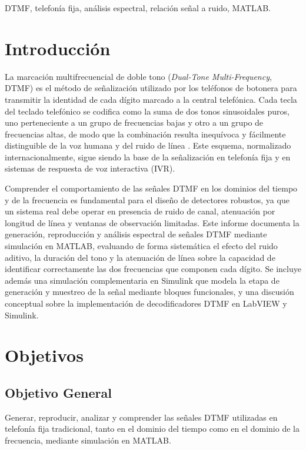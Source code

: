 \documentclass[conference]{IEEEtran}
\begin{document}
\begin{IEEEkeywords}
DTMF, telefonía fija, análisis espectral, relación señal a ruido, MATLAB.
\end{IEEEkeywords}

\section{Introducción}

La marcación multifrecuencial de doble tono (\textit{Dual-Tone Multi-Frequency}, DTMF) es el método de señalización utilizado por los teléfonos de botonera para transmitir la identidad de cada dígito marcado a la central telefónica. Cada tecla del teclado telefónico se codifica como la suma de dos tonos sinusoidales puros, uno perteneciente a un grupo de frecuencias bajas y otro a un grupo de frecuencias altas, de modo que la combinación resulta inequívoca y fácilmente distinguible de la voz humana y del ruido de línea \cite{itu-q23}. Este esquema, normalizado internacionalmente, sigue siendo la base de la señalización en telefonía fija y en sistemas de respuesta de voz interactiva (IVR).

Comprender el comportamiento de las señales DTMF en los dominios del tiempo y de la frecuencia es fundamental para el diseño de detectores robustos, ya que un sistema real debe operar en presencia de ruido de canal, atenuación por longitud de línea y ventanas de observación limitadas. Este informe documenta la generación, reproducción y análisis espectral de señales DTMF mediante simulación en MATLAB, evaluando de forma sistemática el efecto del ruido aditivo, la duración del tono y la atenuación de línea sobre la capacidad de identificar correctamente las dos frecuencias que componen cada dígito. Se incluye además una simulación complementaria en Simulink que modela la etapa de generación y muestreo de la señal mediante bloques funcionales, y una discusión conceptual sobre la implementación de decodificadores DTMF en LabVIEW y Simulink.

\section{Objetivos}

\subsection{Objetivo General}
Generar, reproducir, analizar y comprender las señales DTMF utilizadas en telefonía fija tradicional, tanto en el dominio del tiempo como en el dominio de la frecuencia, mediante simulación en MATLAB.
\end{document}

